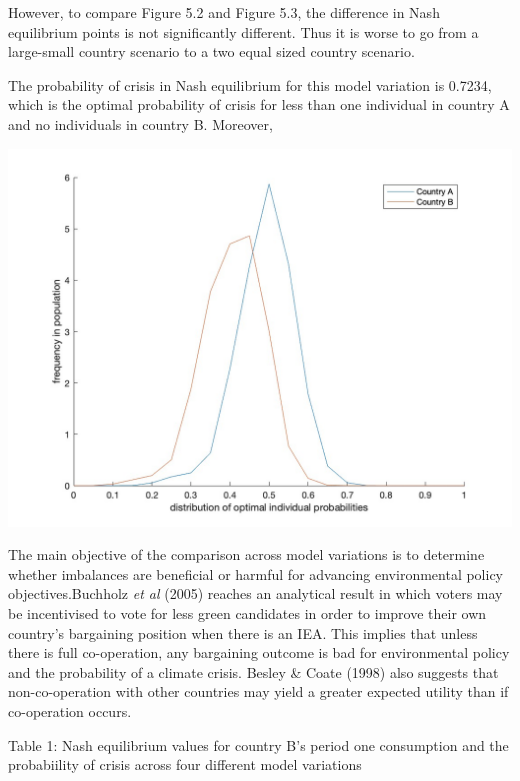 \documentclass[11pt,preprint, authoryear]{elsarticle}
\let\origfigure\figure
\let\endorigfigure\endfigure
\renewenvironment{figure}[1][2] {
    \expandafter\origfigure\expandafter[H]
} {
    \endorigfigure
}
\numberwithin{equation}{section}
\numberwithin{figure}{section}
\numberwithin{table}{section}
\begin{document}
However, to compare Figure 5.2 and Figure 5.3, the difference in Nash
equilibrium points is not significantly different. Thus it is worse to
go from a large-small country scenario to a two equal sized country
scenario.

The probability of crisis in Nash equilibrium for this model variation
is 0.7234, which is the optimal probability of crisis for less than one
individual in country A and no individuals in country B. Moreover,

\begin{figure}[H]

{\centering \includegraphics[width=0.8\linewidth]{images/Fig4_0.5Size0.9Bias} 

}

\caption{0.9 Country A bias model: Kernel density function of the distribution of the optimal probabilty of crisis and frequency thereof across individuals in country A and country B}\label{fig:unnamed-chunk-7}
\end{figure}

The main objective of the comparison across model variations is to
determine whether imbalances are beneficial or harmful for advancing
environmental policy objectives.Buchholz \emph{et al} (2005) reaches an
analytical result in which voters may be incentivised to vote for less
green candidates in order to improve their own country's bargaining
position when there is an IEA. This implies that unless there is full
co-operation, any bargaining outcome is bad for environmental policy and
the probability of a climate crisis. Besley \& Coate (1998) also
suggests that non-co-operation with other countries may yield a greater
expected utility than if co-operation occurs.

\newpage
\begin{center}
Table 1: Nash equilibrium values for country B's period one consumption and the probabiility of crisis across four different model variations
\end{center}
\end{document}
